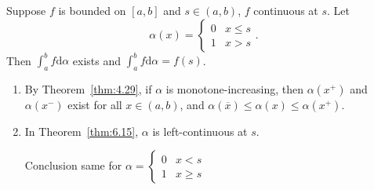 \begin{thm}[15]
	Suppose $f$ is bounded on $[a,b]$ and $s \in (a,b)$, $f$ continuous at $s$.
	Let \[
		\alpha(x)=\begin{cases}
			0 & x\le s \\
			1 & x>s
		\end{cases}
		.\]
	Then $\int_{a}^{b}{f\mathrm{d}\alpha}$ exists and $\int_{a}^{b}{f\mathrm{d}\alpha}=f(s)$.
\end{thm}

\begin{remark}
	\begin{enumerate}
		\item By Theorem~\ref{thm:4.29}, if $\alpha$ is monotone-increasing,
		      then $\alpha(x^{+})$ and $\alpha(x^{-})$ exist for all $x \in (a,b)$, and $\alpha(\overline{x})\le \alpha(x)\le \alpha(x^{+})$.
		\item In Theorem~\ref{thm:6.15}, $\alpha$ is left-continuous at $s$.
		      \begin{exercise}
			      Conclusion same for $\alpha=\begin{cases}
					      0 & x<s    \\
					      1 & x\ge s
				      \end{cases}$
		      \end{exercise}

	\end{enumerate}
\end{remark}

